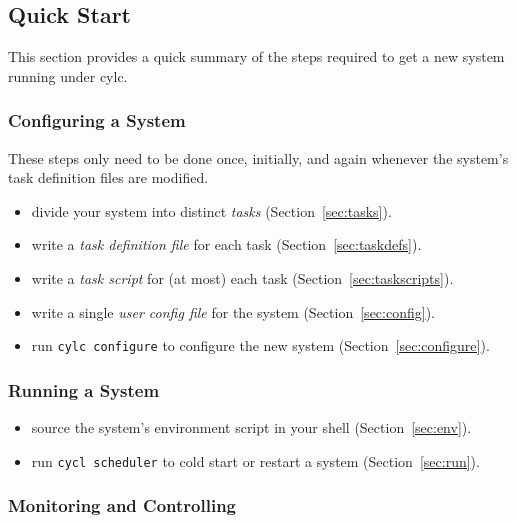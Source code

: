 \documentclass[11pt,a4paper]{article}
\begin{document}
\subsection{Quick Start}

This section provides a quick summary of the steps required to get a new
system running under cylc.

\subsubsection{Configuring a System}

These steps only need to be done once, initially, and again whenever the system's task 
definition files are modified. 

\begin{itemize}
    \item divide your system into distinct {\em tasks} (Section~\ref{sec:tasks}).

    \item write a {\em task definition file} for each task (Section~\ref{sec:taskdefs}).

    \item write a {\em task script} for (at most) each task (Section~\ref{sec:taskscripts}).

    \item write a single {\em user config file} for the system (Section~\ref{sec:config}).

    \item run \verb=cylc configure= to configure the new system (Section~\ref{sec:configure}).
\end{itemize}

\subsubsection{Running a System}

\begin{itemize}
    \item source the system's environment script in your shell (Section~\ref{sec:env}).
        
    \item run \verb=cycl scheduler= to cold start or restart a system (Section~\ref{sec:run}).
\end{itemize}


\subsubsection{Monitoring and Controlling}
\end{document}
